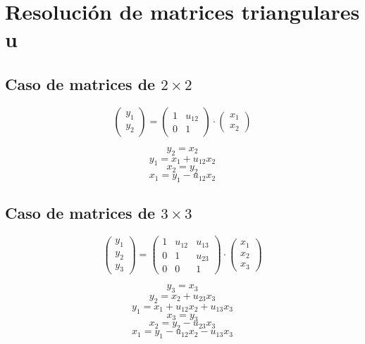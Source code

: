 \documentclass[10pt,a4paper,dvipdfmx]{article}
\begin{document}
\section{Resoluci\'on de matrices triangulares u}
\subsection{Caso de matrices de $2\times 2$ }
$$ \left( 
\begin{array}{c}
y_{1} \\
y_{2} 
 \end{array}
\right)
 = \left( 
\begin{array}{cc}
1 & u_{{1}{2}} \\
0 & 1 
 \end{array}
\right)
 \cdot \left( 
\begin{array}{c}
x_{1} \\
x_{2} 
 \end{array}
\right)
 $$
\begin{multicols}{2}
$$ y_{2} = x_{2} $$
$$ y_{1} = x_{1} + u_{{1}{2}} x_{2} $$
\vfill\null
\columnbreak
$$ x_{2} = y_{2} $$
$$ x_{1} = y_{1}- u_{{1}{2}} x_{2} $$
\end{multicols}
\subsection{Caso de matrices de $3\times 3$ }
$$ \left( 
\begin{array}{c}
y_{1} \\
y_{2} \\
y_{3} 
 \end{array}
\right)
 = \left( 
\begin{array}{ccc}
1 & u_{{1}{2}} & u_{{1}{3}} \\
0 & 1 & u_{{2}{3}} \\
0 & 0 & 1 
 \end{array}
\right)
 \cdot \left( 
\begin{array}{c}
x_{1} \\
x_{2} \\
x_{3} 
 \end{array}
\right)
 $$
\begin{multicols}{2}
$$ y_{3} = x_{3} $$
$$ y_{2} = x_{2} + u_{{2}{3}} x_{3} $$
$$ y_{1} = x_{1} + u_{{1}{2}} x_{2} + u_{{1}{3}} x_{3} $$
\vfill\null
\columnbreak
$$ x_{3} = y_{3} $$
$$ x_{2} = y_{2}- u_{{2}{3}} x_{3} $$
$$ x_{1} = y_{1}- u_{{1}{2}} x_{2}- u_{{1}{3}} x_{3} $$
\end{multicols}
\end{document}
